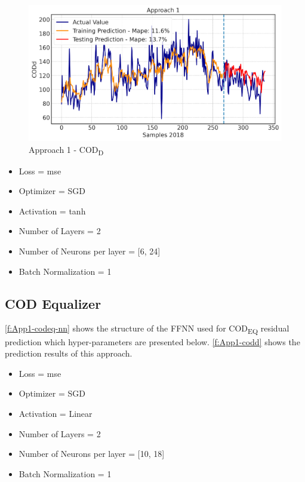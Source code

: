 \begin{figure}[hb!]
\centering
\includegraphics[width=\linewidth]{figures/Ch5/CODd-1.pdf}
\caption{Approach 1 - COD\textsubscript{D}}
\label{f:App1-codd}
\end{figure}

\begin{itemize}
    \item Loss = mse
    \item Optimizer = SGD
    \item Activation =  tanh
    \item Number of Layers = 2
    \item Number of Neurons per layer = [6, 24]
    \item Batch Normalization = 1
\end{itemize}

\subsection{COD Equalizer}
\autoref{f:App1-codeq-nn} shows the structure of the \ac{FFNN} used for \ac{COD}\textsubscript{EQ} residual prediction which hyper-parameters are presented below. \autoref{f:App1-codd} shows the prediction results of this approach.

\begin{itemize}
    \item Loss = mse
    \item Optimizer = SGD
    \item Activation =  Linear
    \item Number of Layers = 2
    \item Number of Neurons per layer = [10, 18]
    \item Batch Normalization = 1
\end{itemize}

